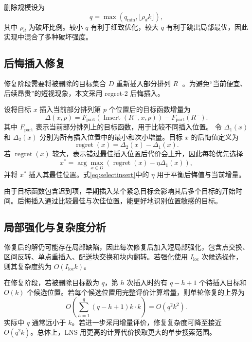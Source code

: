 \documentclass[11pt,a4paper]{ctexart}
\begin{document}
\indent 删除规模设为
\begin{equation}
q=\max(q_{\min},\lfloor \rho_d k\rfloor),\label{eq:q}
\end{equation}
\indent 其中 $\rho_d$ 为破坏比例。较小 $q$ 有利于细致优化，较大 $q$ 有利于跳出局部最优，因此实现中混合了多种破坏强度。

\subsection{后悔插入修复}

\indent 修复阶段需要将被删除的目标集合 $D$ 重新插入部分排列 $R^{-}$。为避免“当前便宜、后续昂贵”的短视现象，本文采用 regret-2 后悔插入。

\indent 设将目标 $x$ 插入当前部分排列第 $p$ 个位置后的目标函数增量为
\begin{equation}
\Delta(x,p)=F_{\mathrm{part}}(\operatorname{Insert}(R^{-},x,p))-F_{\mathrm{part}}(R^{-}).\label{eq:delta}
\end{equation}
\indent 其中 $F_{\mathrm{part}}$ 表示当前部分排列上的目标函数，用于比较不同插入位置。
\indent 令 $\Delta_1(x)$ 和 $\Delta_2(x)$ 分别为所有插入位置中的最小和次小增量。目标 $x$ 的后悔值定义为
\begin{equation}
\operatorname{regret}(x)=\Delta_2(x)-\Delta_1(x).\label{eq:regret}
\end{equation}
\indent 若 $\operatorname{regret}(x)$ 较大，表示错过最佳插入位置后代价会上升，因此每轮优先选择
\begin{equation}
x^*=\arg\max_{x\in D}\left(\operatorname{regret}(x)-\eta \Delta_1(x)\right),\label{eq:selectinsert}
\end{equation}
\indent 并将 $x^*$ 插入其最佳位置。式\eqref{eq:selectinsert}中的 $\eta$ 用于平衡后悔值与当前增量。

\indent 由于目标函数包含迟到项，早期插入某个紧急目标会影响其后多个目标的开始时间。后悔插入通过比较最佳与次佳位置，能更好地识别位置敏感的目标。

\subsection{局部强化与复杂度分析}

\indent 修复后的解仍可能存在局部缺陷，因此每次修复后加入短局部强化，包含点交换、区间反转、单点重插入、配送块交换和块内翻转。若强化使用 $I_{\mathrm{loc}}$ 次候选操作，则其复杂度约为 $O(I_{\mathrm{loc}}k)$。

\indent 在修复阶段，若被删除目标数为 $q$，第 $h$ 次插入时约有 $q-h+1$ 个待插入目标和 $O(k)$ 个候选位置。若每个候选位置用完整评价计算增量，则单轮修复的上界为
\begin{equation}
O\left(\sum_{h=1}^{q}(q-h+1)k\cdot k\right)=O(q^2k^2).
\end{equation}
\indent 实际中 $q$ 通常远小于 $k$。若进一步采用增量评价，修复复杂度可降至接近 $O(q^2k)$。总体上，LNS 用更高的计算代价换取更大的单步搜索范围。
\end{document}
